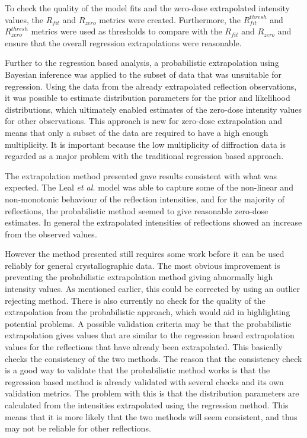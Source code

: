 To check the quality of the model fits and the zero-dose extrapolated intensity values, the $R_{fit}$ and $R_{zero}$ metrics were created.
Furthermore, the $R^{thresh}_{fit}$ and $R^{thresh}_{zero}$ metrics were used as thresholds to compare with the $R_{fit}$ and $R_{zero}$ and ensure that the overall regression extrapolations were reasonable.

Further to the regression based analysis, a probabilistic extrapolation using Bayesian inference was applied to the subset of data that was unsuitable for regression.
Using the data from the already extrapolated reflection observations, it was possible to estimate distribution parameters for the prior and likelihood distributions, which ultimately enabled estimates of the zero-dose intensity values for other observations.
This approach is new for zero-dose extrapolation and means that only a subset of the data are required to have a high enough multiplicity.
It is important because the low multiplicity of diffraction data is regarded as a major problem with the traditional regression based approach.

The extrapolation method presented gave results consistent with what was expected.
The Leal \textit{et al.} model was able to capture some of the non-linear and non-monotonic behaviour of the reflection intensities, and for the majority of reflections, the probabilistic method seemed to give reasonable zero-dose estimates.
In general the extrapolated intensities of reflections showed an increase from the observed values.

However the method presented still requires some work before it can be used reliably for general crystallographic data.
The most obvious improvement is preventing the probabilistic extrapolation method giving abnormally high intensity values.
As mentioned earlier, this could be corrected by using an outlier rejecting method.
There is also currently no check for the quality of the extrapolation from the probabilistic approach, which would aid in highlighting potential problems.
A possible validation criteria may be that the probabilistic extrapolation gives values that are similar to the regression based extrapolation values for the reflections that have already been extrapolated.
This basically checks the consistency of the two methods.
The reason that the consistency check is a good way to validate that the probabilistic method works is that the regression based method is already validated with several checks and its own validation metrics.
The problem with this is that the distribution parameters are calculated from the intensities extrapolated using the regression method.
This means that it is more likely that the two methods will seem consistent, and thus may not be reliable for other reflections.

